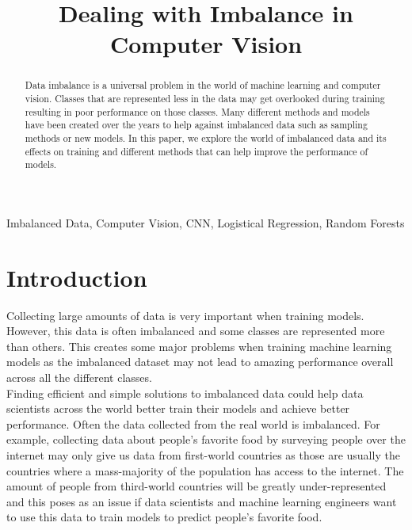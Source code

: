\documentclass[conference]{IEEEtran}
\begin{document}
\title{Dealing with Imbalance in Computer Vision\\}

\author{
}

\maketitle

\begin{abstract}
Data imbalance is a universal problem in the world of machine learning and computer vision. Classes that are represented less in the data may get overlooked during training resulting in poor performance on those classes. Many different methods and models have been created over the years to help against imbalanced data such as sampling methods or new models. In this paper, we explore the world of imbalanced data and its effects on training and different methods that can help improve the performance of models. \\
\end{abstract}

\begin{IEEEkeywords}
Imbalanced Data, Computer Vision, CNN, Logistical Regression, Random Forests\\
\end{IEEEkeywords}

\section{Introduction}

Collecting large amounts of data is very important when training models. However, this data is often imbalanced and some classes are represented more than others. This creates some major problems when training machine learning models as the imbalanced dataset may not lead to amazing performance overall across all the different classes. \\

Finding efficient and simple solutions to imbalanced data could help data scientists across the world better train their models and achieve better performance. Often the data collected from the real world is imbalanced. For example, collecting data about people's favorite food by surveying people over the internet may only give us data from first-world countries as those are usually the countries where a mass-majority of the population has access to the internet. The amount of people from third-world countries will be greatly under-represented and this poses as an issue if data scientists and machine learning engineers want to use this data to train models to predict people's favorite food. \\
\end{document}
